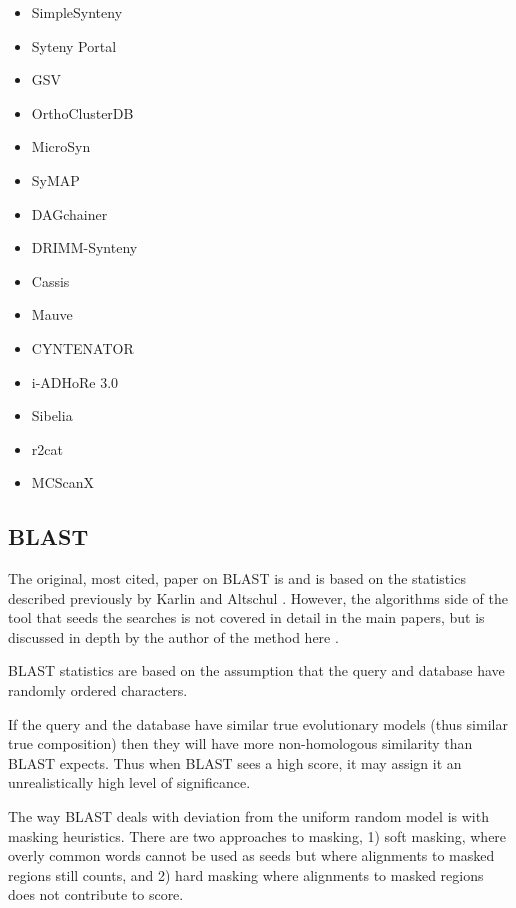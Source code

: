 \begin{itemize}
  \item SimpleSynteny   \cite{veltri2016simplesynteny}
  \item Syteny Portal   \cite{lee2016synteny}
  \item GSV             \cite{revanna2011gsv}
  \item OrthoClusterDB  \cite{ng2009orthoclusterdb}
  \item MicroSyn        \cite{cai2011microsyn}
  \item SyMAP           \cite{soderlund2011symap}
  \item DAGchainer      \cite{haas2004dagchainer}
  \item DRIMM-Synteny   \cite{pham2010drimm}
  \item Cassis          \cite{baudet2010cassis}
  \item Mauve           \cite{darling2004mauve}
  \item CYNTENATOR      \cite{rodelsperger2010cyntenator}
  \item i-ADHoRe 3.0    \cite{proost2012adhore}
  \item Sibelia         \cite{minkin2013sibelia}
  \item r2cat           \cite{husemann2010r2cat}
  \item MCScanX         \cite{wang2012mcscanx}
\end{itemize}

\subsection{BLAST}

The original, most cited, paper on BLAST is \cite{altschul1990basic} and is
based on the statistics described previously by Karlin and Altschul
\cite{karlin1990methods}. However, the algorithms side of the tool that seeds
the searches is not covered in detail in the main papers, but is discussed in
depth by the author of the method here \cite{myers2013s}.

BLAST statistics \cite{karlin1990methods} are based on the assumption that the
query and database have randomly ordered characters.

If the query and the database have similar true evolutionary models (thus
similar true composition) then they will have more non-homologous similarity
than BLAST expects. Thus when BLAST sees a high score, it may assign it an
unrealistically high level of significance.

The way BLAST deals with deviation from the uniform random model is with
masking heuristics. There are two approaches to masking, 1) soft masking, where
overly common words cannot be used as seeds but where alignments to masked
regions still counts, and 2) hard masking where alignments to masked regions
does not contribute to score.

